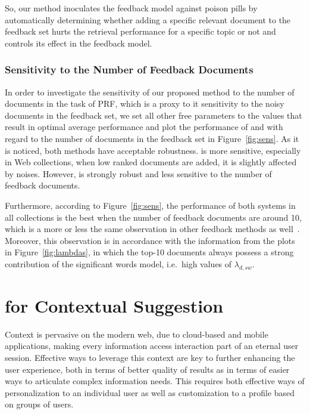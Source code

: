 So, our method inoculates the feedback model against poison pills by automatically determining whether adding a specific relevant document to the feedback set hurts the retrieval performance for a specific topic or not and controls its effect in the feedback model.


\subsubsection{Sensitivity to the Number of Feedback Documents}

In order to investigate the sensitivity of our proposed method to the number of documents in the task of PRF, which is a proxy to it sensitivity to the noisy documents in the feedback set, we set all other free parameters to the values that result in optimal average performance and  plot the performance of \acswlm  and \acrswlm  with regard to the number of documents in the feedback set in Figure~\ref{fig:sens}. As it is noticed,  both methods have acceptable robustness. 
\acswlm  is more sensitive, especially in Web collections, when low ranked documents are added, it is slightly affected by noises.  However, \acrswlm  is strongly robust and less sensitive to the number of feedback documents.

Furthermore, according to Figure~\ref{fig:sens}, the performance of both systems in all collections is the best when the number of feedback documents are around 10, which is a more or less the same observation in other feedback methods as well~\citep{Lv:2009}. Moreover, this observation is in accordance with the information from the plots in Figure~\ref{fig:lambdas}, in which the top-10 documents always possess a strong contribution of the significant words model, i.e.\ high values of $\lambda_{d,sw}$.


\section{\acswlm for Contextual Suggestion}
Context is pervasive on the modern web, due to cloud-based and mobile applications, making every information access interaction part of an eternal user session.  Effective ways to leverage this context are key to further enhancing the user experience, both in terms of better quality of results as in terms of easier ways to articulate complex information needs.  This requires both effective ways of personalization to an individual user as well as customization to a profile based on groups of users.

